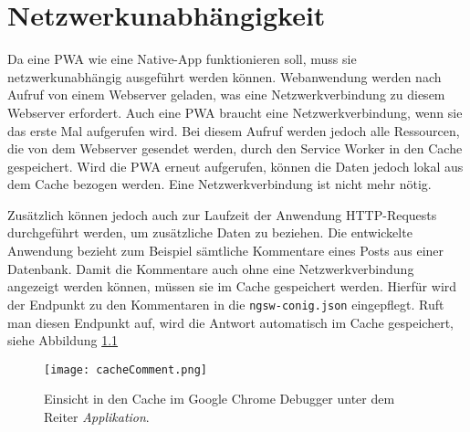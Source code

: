 \chapter{Netzwerkunabhängigkeit}

Da eine PWA wie eine Native-App funktionieren soll, muss sie netzwerkunabhängig ausgeführt werden können. Webanwendung werden nach Aufruf von einem Webserver geladen, was eine Netzwerkverbindung zu diesem Webserver erfordert. Auch eine PWA braucht eine Netzwerkverbindung, wenn sie das erste Mal aufgerufen wird. Bei diesem Aufruf werden jedoch alle Ressourcen, die von dem Webserver gesendet werden, durch den Service Worker in den Cache gespeichert. 
Wird die PWA erneut aufgerufen, können die Daten jedoch lokal aus dem Cache bezogen werden. Eine Netzwerkverbindung ist nicht mehr nötig. 

Zusätzlich können jedoch auch zur Laufzeit der Anwendung HTTP-Requests durchgeführt werden, um zusätzliche Daten zu beziehen. Die entwickelte Anwendung bezieht zum Beispiel sämtliche Kommentare eines Posts aus einer Datenbank. 
Damit die Kommentare auch ohne eine Netzwerkverbindung angezeigt werden können, müssen sie im Cache gespeichert werden. Hierfür wird der Endpunkt zu den Kommentaren in die \texttt{ngsw-conig.json} eingepflegt. 
Ruft man diesen Endpunkt auf, wird die Antwort automatisch im Cache gespeichert, siehe Abbildung \ref{img:cacheComment}

\begin{figure}[!htb]
    \centering
    \texttt{[image: cacheComment.png]}
    \caption{Einsicht in den Cache im Google Chrome Debugger unter dem Reiter \textit{Applikation}.}
    \label{img:cacheComment}
\end{figure}
